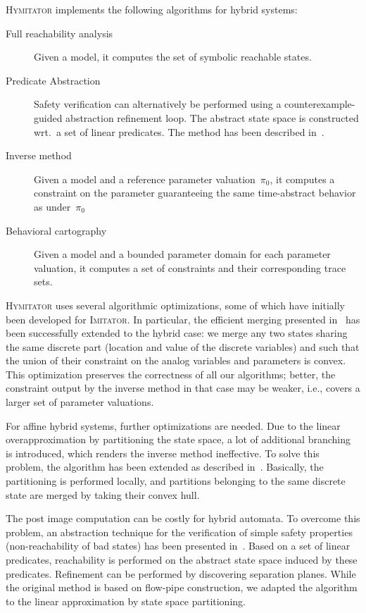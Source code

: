 \documentclass{llncs}
\newcommand{\pio}{\pi_0}
\newcommand{\imitator}{\textsc{Imitator}}
\newcommand{\hymitator}{\textsc{Hymitator}}
\begin{document}
\hymitator{} implements the following algorithms for hybrid systems:
\begin{description}
	\item[Full reachability analysis] Given a model, it computes the set of symbolic reachable states.
\item[Predicate Abstraction] Safety verification can alternatively be performed using a counterexample-guided abstraction refinement loop. The abstract state space is constructed wrt.~a set of linear predicates. The method has been described in~\cite{ADI2006}.
	\item[Inverse method] Given a model and a reference parameter valuation~$\pio$, it computes a constraint on the parameter guaranteeing the same time-abstract behavior as under~$\pio$
	\item[Behavioral cartography] Given a model and a bounded parameter domain for each parameter valuation, it computes a set of constraints and their corresponding trace sets.
\end{description}

\hymitator{} uses several algorithmic optimizations, some of which have initially been developed for \imitator{}.
In particular, the efficient merging presented in~\cite{AFS12} has been successfully extended to the hybrid case: we merge any two states sharing the same discrete part (location and value of the discrete variables) and such that the union of their constraint on the analog variables and parameters is convex.
This optimization preserves the correctness of all our algorithms; better, the constraint output by the inverse method in that case may be weaker, i.e., covers a larger set of parameter valuations.

For affine hybrid systems, further optimizations are needed. Due to the linear overapproximation by partitioning the state space, a lot of additional branching is introduced, which renders the inverse method ineffective. To solve this problem, the algorithm has been extended as described in~\cite{FK11}. Basically, the partitioning is performed locally, and partitions belonging to the same discrete state are merged by taking their convex hull. 

The post image computation can be costly for hybrid automata. To overcome this problem, an abstraction technique for the verification of simple safety  properties (non-reachability of bad states) has been presented in~\cite{ADI2006}. Based on a set of linear predicates, reachability is performed on the abstract state space induced by these predicates. Refinement can be performed by discovering separation planes. While the original method is based on flow-pipe construction, we adapted the algorithm to the linear approximation by state space partitioning. 
\end{document}
